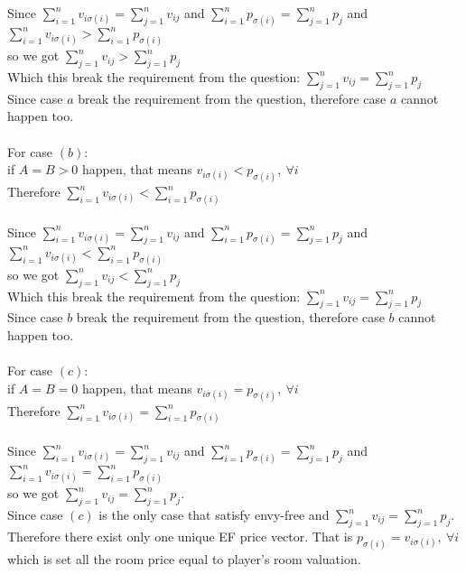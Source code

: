 \documentclass{article}
\begin{document}
Since $\sum_{i = 1}^n v_{i\sigma(i)} = \sum_{j = 1}^n v_{ij}$ and $\sum_{i = 1}^n p_{\sigma(i)} = \sum_{j = 1}^n p_{j}$ and $\sum_{i = 1}^n v_{i\sigma(i)} > \sum_{i = 1}^n p_{\sigma(i)}$\\
so we got $\sum_{j = 1}^n v_{ij} > \sum_{j = 1}^n p_{j}$\\
Which this break the requirement from the question: $\sum_{j = 1}^n v_{ij} = \sum_{j = 1}^n p_{j}$\\
Since case $a$ break the requirement from the question, therefore case $a$ cannot happen too.\\\\
For case $(b)$:\\
if $A = B > 0$ happen, that means $v_{i\sigma(i)} < p_{\sigma(i)},\ \forall i$\\
Therefore $\sum_{i = 1}^n v_{i\sigma(i)} < \sum_{i = 1}^n p_{\sigma(i)}$\\\\
Since $\sum_{i = 1}^n v_{i\sigma(i)} = \sum_{j = 1}^n v_{ij}$ and $\sum_{i = 1}^n p_{\sigma(i)} = \sum_{j = 1}^n p_{j}$ and $\sum_{i = 1}^n v_{i\sigma(i)} < \sum_{i = 1}^n p_{\sigma(i)}$\\
so we got $\sum_{j = 1}^n v_{ij} < \sum_{j = 1}^n p_{j}$\\
Which this break the requirement from the question: $\sum_{j = 1}^n v_{ij} = \sum_{j = 1}^n p_{j}$\\
Since case $b$ break the requirement from the question, therefore case $b$ cannot happen too.\\\\
For case $(c)$:\\
if $A=B=0$ happen, that means $v_{i\sigma(i)} = p_{\sigma(i)},\ \forall i$\\
Therefore $\sum_{i = 1}^n v_{i\sigma(i)} = \sum_{i = 1}^n p_{\sigma(i)}$\\\\
Since $\sum_{i = 1}^n v_{i\sigma(i)} = \sum_{j = 1}^n v_{ij}$ and $\sum_{i = 1}^n p_{\sigma(i)} = \sum_{j = 1}^n p_{j}$ and $\sum_{i = 1}^n v_{i\sigma(i)} = \sum_{i = 1}^n p_{\sigma(i)}$\\
so we got $\sum_{j = 1}^n v_{ij} = \sum_{j = 1}^n p_{j}$.\\
Since case $(c)$ is the only case that satisfy envy-free and $\sum_{j = 1}^n v_{ij} = \sum_{j = 1}^n p_{j}$. Therefore there exist only one unique EF price vector. That is $p_{\sigma(i)} = v_{i\sigma(i)},\ \forall i$ which is set all the room price equal to player's room valuation. 
\newpage
\end{document}

